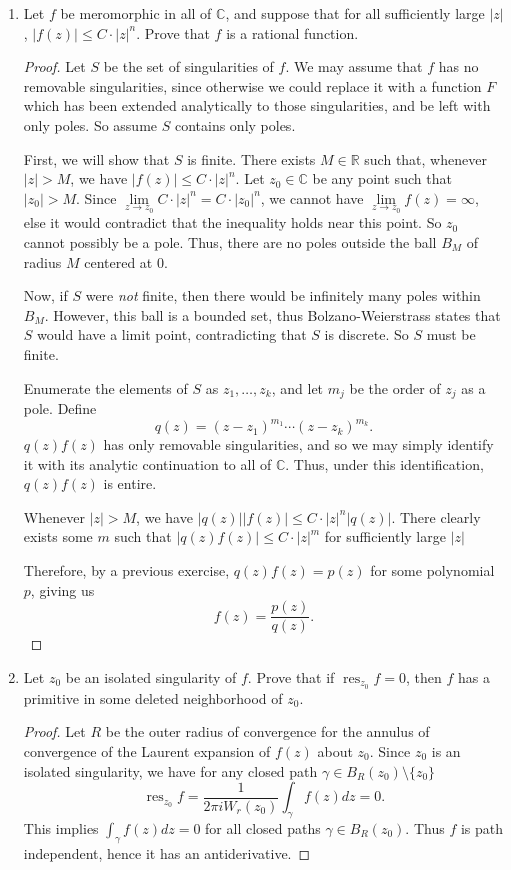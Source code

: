 \documentclass[10pt]{article}
\newcommand{\R}{\mathbb{R}}
\newcommand{\C}{\mathbb{C}}
\DeclareMathOperator*{\res}{res}
\begin{document}
\begin{enumerate}
\item Let $f$ be meromorphic in all of $\C$, and suppose that for all sufficiently large $|z|$, $|f(z)| \leq C \cdot |z|^n$.  Prove that $f$ is a rational function.

\begin{proof}
Let $S$ be the set of singularities of $f$.  We may assume that $f$ has no removable singularities, since otherwise we could replace it with a function $F$ which has been extended analytically to those singularities, and be left with only poles.  So assume $S$ contains only poles.

First, we will show that $S$ is finite.  There exists $M \in \R$ such that, whenever $|z| > M$, we have $|f(z)| \leq C\cdot |z|^n$.  Let $z_0 \in \C$ be any point such that $|z_0| > M$.  Since $\lim\limits_{z \rightarrow z_0} C \cdot |z|^n = C \cdot |z_0|^n$, we cannot have $\lim\limits_{z \rightarrow z_0} f(z) = \infty$, else it would contradict that the inequality holds near this point.  So $z_0$ cannot possibly be a pole.  Thus, there are no poles outside the ball $B_M$ of radius $M$ centered at 0.

Now, if $S$ were \emph{not} finite, then there would be infinitely many poles within $B_M$.  However, this ball is a bounded set, thus Bolzano-Weierstrass states that $S$ would have a limit point, contradicting that $S$ is discrete.  So $S$ must be finite.

Enumerate the elements of $S$ as $z_1, \dots , z_k$, and let $m_j$ be the order of $z_j$ as a pole.  Define
$$
q(z) = (z - z_1)^{m_1} \cdots (z - z_k)^{m_k}.
$$
$q(z)f(z)$ has only removable singularities, and so we may simply identify it with its analytic continuation to all of $\C$.  Thus, under this identification, $q(z) f(z)$ is entire.

Whenever $|z| > M$, we have $|q(z)||f(z)| \leq C \cdot |z|^n |q(z)|$.  There clearly exists some $m$ such that $|q(z)f(z)| \leq C \cdot |z|^m$ for sufficiently large $|z|$

Therefore, by a previous exercise, $q(z)f(z) = p(z)$ for some polynomial $p$, giving us
$$
f(z) = \frac{p(z)}{q(z)}.
$$
\end{proof}

\item Let $z_0$ be an isolated singularity of $f$.  Prove that if $\res_{z_0}f = 0$, then $f$ has a primitive in some deleted neighborhood of $z_0$.

\begin{proof}
Let $R$ be the outer radius of convergence for the annulus of convergence of the Laurent expansion of $f(z)$ about $z_0$.  Since $z_0$ is an isolated singularity, we have for any closed path $\gamma \in B_R(z_0) \setminus \{z_0\}$
$$
\res\nolimits_{z_0} f = \frac{1}{2\pi i W_r(z_0)} \int_{\gamma} f(z) dz = 0.
$$
This implies $\int_{\gamma} f(z) dz = 0$ for all closed paths $\gamma \in B_R(z_0)$.  Thus $f$ is path independent, hence it has an antiderivative.
\end{proof}


\end{enumerate}
\end{document}

